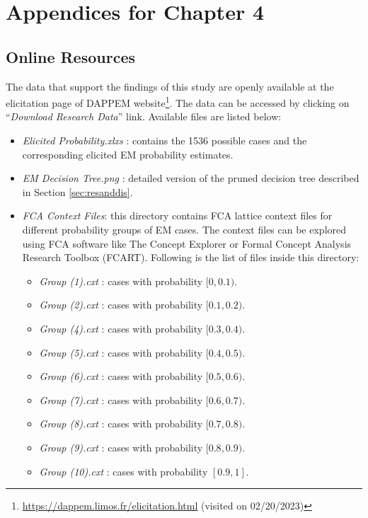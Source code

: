 \resumetocwriting
\chapter{Appendices for Chapter 4}
\section{Online Resources}\label{sec:app-online-elicitaion}
The data that support the findings of this study are openly available at the elicitation page of DAPPEM website\footnote{\url{https://dappem.limos.fr/elicitation.html} (visited on 02/20/2023)}. The data can be accessed by clicking on \enquote{\textit{Download Research Data}} link. Available files are listed below:
\begin{itemize}
	\item{\textit{Elicited Probability.xlxs} : contains the 1536 possible cases and the corresponding elicited EM probability estimates.}
	\item{\textit{EM Decision Tree.png} : detailed version of the pruned decision tree described in Section \ref{sec:resanddis}.}
	\item{\textit{FCA Context Files}: this directory contains FCA lattice context files for different probability groups of EM cases. The context files can be explored using FCA software like The Concept Explorer \cite{ConExp} or Formal Concept Analysis Research Toolbox (FCART)\cite{FCART}. Following is the list of files inside this directory: }
	\begin{itemize}
		\item{\textit{Group (1).cxt} : cases with probability $[0,0.1)$.}
		\item{\textit{Group (2).cxt} : cases with probability $[0.1,0.2)$.}
		\item{\textit{Group (4).cxt} : cases with probability $[0.3,0.4)$.}
		\item{\textit{Group (5).cxt} : cases with probability $[0.4,0.5)$.}
		\item{\textit{Group (6).cxt} : cases with probability $[0.5,0.6)$.}
		\item{\textit{Group (7).cxt} : cases with probability $[0.6,0.7)$.}
		\item{\textit{Group (8).cxt} : cases with probability $[0.7,0.8)$.}
		\item{\textit{Group (9).cxt} : cases with probability $[0.8,0.9)$.}
		\item{\textit{Group (10).cxt} : cases with probability $[0.9,1]$.}
	\end{itemize}
\end{itemize}
\resumetocwriting

